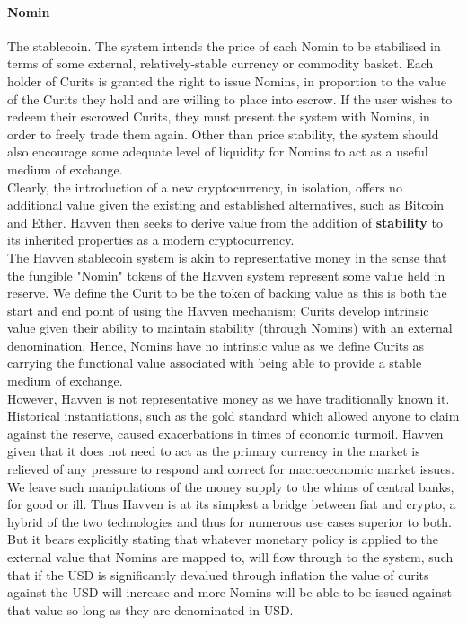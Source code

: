 \documentclass{article}
\begin{document}
\paragraph{Nomin} The stablecoin. The system intends the price of each Nomin to be stabilised in terms of some external, relatively-stable currency or commodity basket. Each holder of Curits is granted the right to issue Nomins, in proportion to the value of the Curits they hold and are willing to place into escrow. If the user wishes to redeem their escrowed Curits, they must present the system with Nomins, in order to freely trade them again. Other than price stability, the system should also encourage some adequate level of liquidity for Nomins to act as a useful medium of exchange. \\

\noindent Clearly, the introduction of a new cryptocurrency, in isolation, offers no additional value given the existing and established alternatives, such as Bitcoin and Ether. Havven then seeks to derive value from the addition of \textbf{stability} to its inherited properties as a modern cryptocurrency. \\

\noindent The Havven stablecoin system is akin to representative money in the sense that the fungible "Nomin" tokens of the Havven system represent some value held in reserve. We define the Curit to be the token of backing value as this is both the start and end point of using the Havven mechanism; Curits develop intrinsic value given their ability to maintain stability (through Nomins) with an external denomination. Hence, Nomins have no intrinsic value as we define Curits as carrying the functional value associated with being able to provide a stable medium of exchange. \\

\noindent However, Havven is not representative money as we have traditionally known it. Historical instantiations, such as the gold standard which allowed anyone to claim against the reserve, caused exacerbations in times of economic turmoil. Havven given that it does not need to act as the primary currency in the market is relieved of any pressure to respond and correct for macroeconomic market issues. We leave such manipulations of the money supply to the whims of central banks, for good or ill. Thus Havven is at its simplest a bridge between fiat and crypto, a hybrid of the two technologies and thus for numerous use cases superior to both. But it bears explicitly stating that whatever monetary policy is applied to the external value that Nomins are mapped to, will flow through to the system, such that if the USD is significantly devalued through inflation the value of curits against the USD will increase and more Nomins will be able to be issued against that value so long as they are denominated in USD. \\
\end{document}
